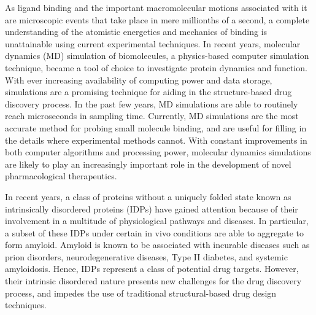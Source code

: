 As ligand binding and the important macromolecular motions associated with it are microscopic events that take place in mere millionths of a second, a complete understanding of the atomistic energetics and mechanics of binding is unattainable using current experimental techniques. In recent years, molecular dynamics (MD) simulation of biomolecules, a physics-based computer simulation technique, became a tool of choice to investigate protein dynamics and function.  With ever increasing availability of computing power and data storage, simulations are a promising technique for aiding in the structure-based drug discovery process. In the past few years, MD simulations are able to routinely reach microseconds in sampling time.  Currently, MD simulations are the most accurate method for probing small molecule binding, and are useful for filling in the details where experimental methods cannot.  With constant improvements in both computer algorithms and processing power, molecular dynamics simulations are likely to play an increasingly important role in the development of novel pharmacological therapeutics.\cite{Durrant:2011bm}  %

In recent years, a class of proteins without a uniquely folded state known as intrinsically disordered proteins (IDPs) have gained attention because of their involvement in a multitude of physiological pathways and diseases. In particular, a subset of these IDPs under certain in vivo conditions are able to aggregate to form amyloid. Amyloid is known to be associated with incurable diseases such as prion disorders, neurodegenerative diseases, Type II diabetes, and systemic amyloidosis. Hence, IDPs represent a class of potential drug targets. However, their intrinsic disordered nature presents new challenges for the drug discovery process, and impedes the use of traditional structural-based drug design techniques.


